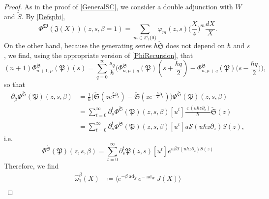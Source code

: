 \documentclass[10pt,a4paper,oneside,no-math,reqno]{amsart}%
\theoremstyle{plain}
\theoremstyle{definition}
\theoremstyle{remark}
\numberwithin{equation}{section}
\renewcommand{\phi}{\varphi}
\newcommand{\mb}[1]{\mathbb{#1}}
\newcommand{\mf}[1]{\mathfrak{#1}}
\newcommand{\mc}[1]{\mathcal{#1}}
\newcommand{\1}{\mathds{1}}
\newcommand{\Z}{\mb{Z}}
\newcommand{\<}{\langle}
\renewcommand{\>}{\rangle}
\newcommand{\del}{\partial}
\DeclareMathOperator{\ad}{ad}
\begin{document}
\begin{proof}
    As in the proof of \cref{GeneralSC}, we consider a double adjunction with $ W$ and $ \check{S}$. By \cref{Defsphi}, 
    \begin{equation}
        \Phi^{\mf{W}} (\mf{J} (X) ) (z,s, \beta = 1)
        =
        \sum_{m \in \Z \setminus \{ 0\} } \phi_m (z,s) \Big( \frac{X}{z} \Big)^m \frac{dX}{X}.
    \end{equation}
    On the other hand, because the generating series $ \hbar \check{\mf{S}} $ does not depend on $\hbar$ and $s$, we find, using the appropriate version of \cref{PhiRecursion}, that
    \begin{equation}
        (n+1) \Phi^{\check{\mf{S}}}_{n+1,\mu} (\mf{P}) (s) 
		=
		\sum_{q = 0}^\infty \frac{s_q}{\hbar} \Big( \Phi^{\check{\mf{S}}}_{n, \mu+q}(\mf{P}) ( s + \frac{\hbar q}{2}) - \Phi^{\check{\mf{S}}}_{n,\mu+q} (\mf{P}) \big( s - \frac{\hbar q}{2}\big) \Big),
	\end{equation}
    so that
    \begin{equation}
        \begin{split}
            \del_\beta \Phi^{\check{\mf{S}}} ( \mf{P}) (z,s,\beta) 
            &=
            \frac{1}{\hbar} \Big( \check{\mf{S}} (z e^{\frac{\hbar}{2} \del_s}) - \check{\mf{S}} (z e^{-\frac{\hbar}{2} \del_s}) \Big) \Phi^{\check{\mf{S}}}(\mf{P}) ( z, s, \beta)
            \\
            &=
            \sum_{t=0}^\infty \del_s^t \Phi^{\check{\mf{S}}} (\mf{P}) ( z, s, \beta) [u^t] \frac{\varsigma ( u \hbar z \del_z)}{\hbar} \check{\mf{S}}(z) 
            \\
            &=
            \sum_{t=0}^\infty \del_s^t \Phi^{\check{\mf{S}}} (\mf{P}) ( z, s, \beta) [u^t] u \mc{S} ( u \hbar z \del_z) S(z) ,
        \end{split}
    \end{equation}
    i.e.
    \begin{equation}
        \Phi^{\check{\mf{S}}} ( \mf{P}) (z,s,\beta) 
        =
        \sum_{t=0}^\infty \del_s^t \mf{P} ( z, s) [u^t] e^{u \beta \mc{S} ( u \hbar z \del_z) S(z)}
    \end{equation}
	Therefore, we find
	\begin{equation}
		\begin{split}
			\widehat{\omega}^\beta_{1} (X)
            &\coloneqq
            \Big\< e^{- \beta \ad_{\check{S}}} e^{- \ad_W} J(X) \Big\>
            \\

\end{split}
\end{equation}
\end{proof}
\end{document}
